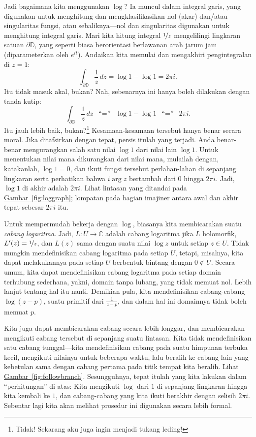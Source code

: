 \documentclass[12pt,openany]{book}
\newcommand{\C}{{\mathbb{C}}}
\newcommand{\D}{{\mathbb{D}}}
\newcommand{\myindex}[1]{#1\index{#1}}
\newcommand{\myquote}[1]{``#1''}
\theoremstyle{plain}
\theoremstyle{remark}
\theoremstyle{definition}
\theoremstyle{exercise}
\theoremstyle{example}
\newcommand{\figureref}[1]{\hyperref[#1]{Gambar~\ref*{#1}}}
\begin{document}
Jadi bagaimana kita menggunakan $\log$?  Ia muncul dalam integral garis, yang digunakan
untuk menghitung dan mengklasifikasikan nol (akar) dan/atau singularitas fungsi, atau
sebaliknya---nol dan singularitas digunakan untuk menghitung integral garis.
Mari kita hitung integral $\nicefrac{1}{z}$ mengelilingi lingkaran
satuan $\partial \D$, yang seperti biasa berorientasi berlawanan arah jarum jam (diparameterkan
oleh $e^{it}$).  Andaikan kita memulai dan mengakhiri pengintegralan di 
$z=1$:
\begin{equation*}
\int_{\partial \D} \frac{1}{z} \, dz
= \log 1 - \log 1 = 2\pi i.
\end{equation*}
Itu tidak masuk akal, bukan?  Nah, sebenarnya ini hanya boleh dilakukan
dengan tanda kutip:
\begin{equation*}
\int_{\partial \D} \frac{1}{z} \, dz
\enspace
\text{``$=$''}
\enspace
\log 1 - \log 1
\enspace
\text{``$=$''}
\enspace
2\pi i.
\end{equation*}
Itu jauh lebih baik,
bukan?\footnote{Tidak! Sekarang aku juga ingin menjadi tukang leding!}
Kesamaan-kesamaan tersebut hanya benar secara moral.
Jika ditafsirkan dengan tepat, persis itulah yang terjadi.  Anda benar-benar mengurangkan
salah satu nilai $\log 1$ dari nilai lain $\log 1$.  Untuk menentukan
nilai mana dikurangkan dari nilai mana, mulailah dengan, katakanlah, $\log 1 = 0$, dan ikuti
fungsi tersebut perlahan-lahan di sepanjang lingkaran serta perhatikan bahwa $i \arg z$ bertambah dari $0$ hingga
$2\pi i$.  Jadi, $\log 1$ di akhir adalah $2 \pi i$.  Lihat lintasan
yang ditandai pada \figureref{fig:loggraph}; lompatan pada bagian imajiner antara
awal dan akhir tepat sebesar $2\pi i$ itu.

Untuk mempermudah bekerja dengan $\log$, biasanya kita membicarakan suatu
\emph{\myindex{cabang logaritma}}.  Jadi, $L \colon U \to \C$ adalah cabang
logaritma jika $L$ holomorfik, $L'(z) = \nicefrac{1}{z}$, dan $L(z)$ sama
dengan suatu nilai $\log z$ untuk setiap $z \in U$.  Tidak mungkin mendefinisikan
cabang logaritma pada setiap $U$, tetapi, misalnya, kita dapat melakukannya pada setiap
$U$ berbentuk bintang dengan $0 \notin U$.  Secara umum, kita dapat mendefinisikan cabang
logaritma pada setiap domain terhubung sederhana, yakni, domain tanpa lubang,
yang tidak memuat nol.
Lebih lanjut tentang hal itu nanti.  Demikian pula, kita mendefinisikan cabang-cabang $\log (z-p)$,
suatu primitif dari $\frac{1}{z-p}$, dan dalam hal ini domainnya
tidak boleh memuat $p$.

Kita juga dapat membicarakan cabang secara lebih longgar, dan membicarakan
mengikuti cabang tersebut di sepanjang suatu lintasan.  Kita tidak mendefinisikan
satu cabang tunggal---kita mendefinisikan cabang pada suatu himpunan terbuka kecil,
mengikuti nilainya untuk beberapa waktu, lalu beralih ke cabang lain yang 
kebetulan sama dengan cabang pertama pada titik tempat kita
beralih.  Lihat \figureref{fig:followbranch}.  Sesungguhnya, tepat itulah yang kita lakukan dalam
\myquote{perhitungan} di atas: Kita mengikuti $\log$ dari $1$ di sepanjang lingkaran hingga kita
kembali ke $1$, dan cabang-cabang yang kita ikuti berakhir dengan selisih $2\pi i$.
Sebentar lagi kita akan melihat prosedur ini digunakan secara lebih formal.
\end{document}
